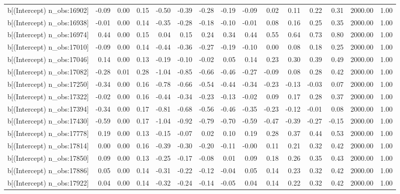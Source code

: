 \begin{table}[ht]
\begin{tabular}{rrrrrrrrrrrrrrr}
  b[(Intercept) n\_obs:16902] & -0.09 & 0.00 & 0.15 & -0.50 & -0.39 & -0.28 & -0.19 & -0.09 & 0.02 & 0.11 & 0.22 & 0.31 & 2000.00 & 1.00 \\ 
  b[(Intercept) n\_obs:16938] & -0.01 & 0.00 & 0.14 & -0.35 & -0.28 & -0.18 & -0.10 & -0.01 & 0.08 & 0.16 & 0.25 & 0.35 & 2000.00 & 1.00 \\ 
  b[(Intercept) n\_obs:16974] & 0.44 & 0.00 & 0.15 & 0.04 & 0.15 & 0.24 & 0.34 & 0.44 & 0.55 & 0.64 & 0.73 & 0.80 & 2000.00 & 1.00 \\ 
  b[(Intercept) n\_obs:17010] & -0.09 & 0.00 & 0.14 & -0.44 & -0.36 & -0.27 & -0.19 & -0.10 & 0.00 & 0.08 & 0.18 & 0.25 & 2000.00 & 1.00 \\ 
  b[(Intercept) n\_obs:17046] & 0.14 & 0.00 & 0.13 & -0.19 & -0.10 & -0.02 & 0.05 & 0.14 & 0.23 & 0.30 & 0.39 & 0.49 & 2000.00 & 1.00 \\ 
  b[(Intercept) n\_obs:17082] & -0.28 & 0.01 & 0.28 & -1.04 & -0.85 & -0.66 & -0.46 & -0.27 & -0.09 & 0.08 & 0.28 & 0.42 & 2000.00 & 1.00 \\ 
  b[(Intercept) n\_obs:17250] & -0.34 & 0.00 & 0.16 & -0.78 & -0.66 & -0.54 & -0.44 & -0.34 & -0.23 & -0.13 & -0.03 & 0.07 & 2000.00 & 1.00 \\ 
  b[(Intercept) n\_obs:17322] & -0.02 & 0.00 & 0.16 & -0.44 & -0.34 & -0.23 & -0.13 & -0.02 & 0.09 & 0.17 & 0.28 & 0.37 & 2000.00 & 1.00 \\ 
  b[(Intercept) n\_obs:17394] & -0.34 & 0.00 & 0.17 & -0.81 & -0.68 & -0.56 & -0.46 & -0.35 & -0.23 & -0.12 & -0.01 & 0.08 & 2000.00 & 1.00 \\ 
  b[(Intercept) n\_obs:17430] & -0.59 & 0.00 & 0.17 & -1.04 & -0.92 & -0.79 & -0.70 & -0.59 & -0.47 & -0.39 & -0.27 & -0.15 & 2000.00 & 1.00 \\ 
  b[(Intercept) n\_obs:17778] & 0.19 & 0.00 & 0.13 & -0.15 & -0.07 & 0.02 & 0.10 & 0.19 & 0.28 & 0.37 & 0.44 & 0.53 & 2000.00 & 1.00 \\ 
  b[(Intercept) n\_obs:17814] & 0.00 & 0.00 & 0.16 & -0.39 & -0.30 & -0.20 & -0.11 & -0.00 & 0.11 & 0.21 & 0.32 & 0.42 & 2000.00 & 1.00 \\ 
  b[(Intercept) n\_obs:17850] & 0.09 & 0.00 & 0.13 & -0.25 & -0.17 & -0.08 & 0.01 & 0.09 & 0.18 & 0.26 & 0.35 & 0.43 & 2000.00 & 1.00 \\ 
  b[(Intercept) n\_obs:17886] & 0.05 & 0.00 & 0.14 & -0.31 & -0.22 & -0.12 & -0.04 & 0.05 & 0.14 & 0.23 & 0.32 & 0.42 & 2000.00 & 1.00 \\ 
  b[(Intercept) n\_obs:17922] & 0.04 & 0.00 & 0.14 & -0.32 & -0.24 & -0.14 & -0.05 & 0.04 & 0.14 & 0.22 & 0.32 & 0.42 & 2000.00 & 1.00 \\ 

\end{tabular}
\end{table}
